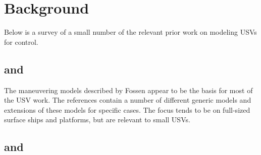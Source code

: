 \documentclass[11pt,draftcls,journal,onecolumn]{IEEEtran}
\begin{document}
\section{Background}

Below is a survey of a small number of the relevant prior work on modeling USVs for control.  

\subsection{\cite{fossen94guidance} and \cite{fossen11handbook}}
The maneuvering models described by Fossen appear to be the basis for most of the USV work.  The references contain a number of different generic models and extensions of these models for specific cases.  The focus tends to be on full-sized surface ships and platforms, but are relevant to small USVs. 

\subsection{\cite{sonnenburg10control} and \cite{sonnenburg13modeling}}
\end{document}

